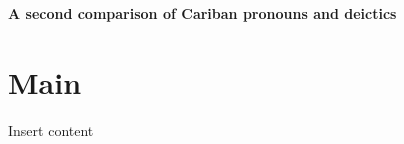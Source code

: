\documentclass[10pt]{article}
\begin{document}
\begin{center}
\Large \bfseries {A second comparison of Cariban pronouns and deictics}
\end{center}
\tableofcontents

\section{\texorpdfstring{Main \label{sec:main}}{Main }}

Insert content

\printbibliography
\end{document}
